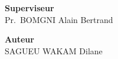 \documentclass[14pt,a4paper]{extarticle}
\begin{document}
\vspace{3em}

\noindent
\begin{minipage}[t]{0.48\linewidth}
\centering
\textbf{Superviseur}\\[2.5em]
Pr.~BOMGNI Alain Bertrand
\end{minipage}\hfill
\begin{minipage}[t]{0.48\linewidth}
\centering
\textbf{Auteur}\\[2.5em]
SAGUEU WAKAM Dilane
\end{minipage}
\end{document}
